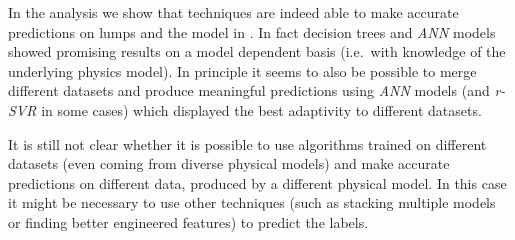 In the analysis we show that \ml techniques are indeed able to make accurate predictions on lumps and the \wzw model in \sft.
In fact decision trees and \emph{ANN} models showed promising results on a model dependent basis (i.e.\ with knowledge of the underlying physics model).
In principle it seems to also be possible to merge different datasets and produce meaningful predictions using \emph{ANN} models (and \emph{r-SVR} in some cases) which displayed the best adaptivity to different datasets.

It is still not clear whether it is possible to use algorithms trained on different datasets (even coming from diverse physical models) and make accurate predictions on different data, produced by a different physical model.
In this case it might be necessary to use other techniques (such as stacking multiple models or finding better engineered features) to predict the labels.
